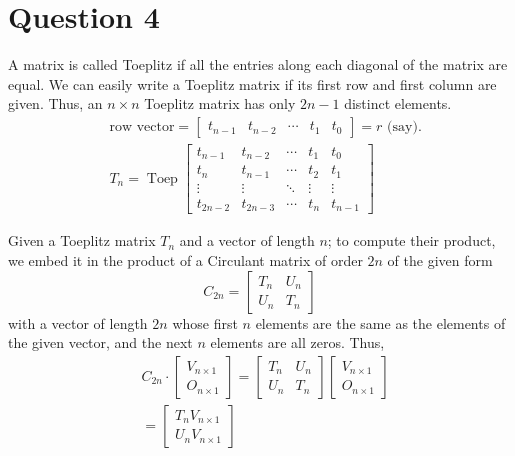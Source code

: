 \documentclass{article}
\begin{document}
\section{Question 4}
A matrix is called Toeplitz if all the entries along each diagonal of the matrix are equal. We can easily write a Toeplitz matrix if its first row and first column are given. Thus, an \( n \times n \) Toeplitz matrix has only \( 2n-1 \) distinct elements.
\[
\begin{aligned}
& \text{row vector} = \begin{bmatrix}
t_{n-1} & t_{n-2} & \cdots & t_1 & t_0
\end{bmatrix} = r \text{ (say).} \\
& T_n = \operatorname{Toep}\begin{bmatrix}
t_{n-1} & t_{n-2} & \cdots & t_1 & t_0 \\
t_{n} & t_{n-1} & \cdots & t_2 & t_1 \\
\vdots & \vdots & \ddots & \vdots & \vdots \\
t_{2n-2} & t_{2n-3} & \cdots & t_{n} & t_{n-1}
\end{bmatrix}
\end{aligned}
\]

Given a Toeplitz matrix \( T_n \) and a vector of length \( n \); to compute their product, we embed it in the product of a Circulant matrix of order \( 2n \) of the given form
\[
C_{2n} = \begin{bmatrix}
T_n & U_n \\
U_n & T_n
\end{bmatrix}
\]
with a vector of length \( 2n \) whose first \( n \) elements are the same as the elements of the given vector, and the next \( n \) elements are all zeros. Thus,
\[
\begin{aligned}
& C_{2n} \cdot \begin{bmatrix}
V_{n \times 1} \\
O_{n \times 1}
\end{bmatrix} = \begin{bmatrix}
T_n & U_n \\
U_n & T_n
\end{bmatrix} \begin{bmatrix}
V_{n \times 1} \\
O_{n \times 1}
\end{bmatrix} \\
& = \begin{bmatrix}
T_n V_{n \times 1} \\
U_n V_{n \times 1}
\end{bmatrix}
\end{aligned}
\]
\end{document}

